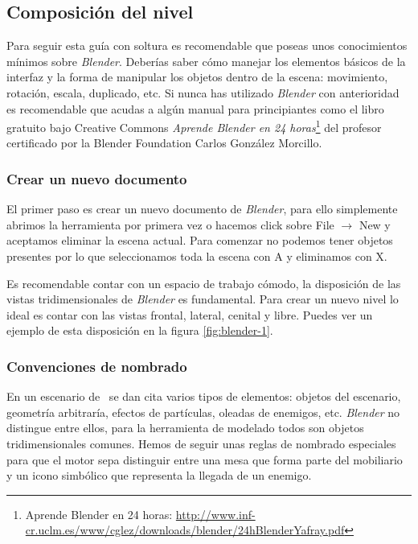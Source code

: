 \documentclass[a4paper,11pt]{article}
\begin{document}
\subsection{Composición del nivel}

Para seguir esta guía con soltura es recomendable que poseas unos conocimientos
mínimos sobre \textit{Blender}. Deberías saber cómo manejar los elementos
básicos de la interfaz y la forma de manipular los objetos dentro de la
escena: movimiento, rotación, escala, duplicado, etc. Si nunca has utilizado
\textit{Blender} con anterioridad es recomendable que acudas a algún
manual para principiantes como el libro gratuito bajo Creative Commons
\textit{Aprende Blender en 24 horas}\footnote{Aprende Blender en 24 horas: 
\url{http://www.inf-cr.uclm.es/www/cglez/downloads/blender/24hBlenderYafray.pdf}}
del profesor certificado por la Blender Foundation Carlos González Morcillo.

\subsubsection{Crear un nuevo documento}

El primer paso es crear un nuevo documento de \textit{Blender}, para ello
simplemente abrimos la herramienta por primera vez o hacemos click sobre
File $\rightarrow$ New y aceptamos eliminar la escena actual. Para comenzar
no podemos tener objetos presentes por lo que seleccionamos toda la escena
con A y eliminamos con X.


Es recomendable contar con un espacio de trabajo cómodo, la disposición
de las vistas tridimensionales de \textit{Blender} es fundamental. Para
crear un nuevo nivel lo ideal es contar con las vistas frontal, lateral,
cenital y libre. Puedes ver un ejemplo de esta disposición en la figura
\ref{fig:blender-1}.

\subsubsection{Convenciones de nombrado}

En un escenario de \juego\ se dan cita varios tipos de elementos: objetos
del escenario, geometría arbitraría, efectos de partículas, oleadas de enemigos,
etc. \textit{Blender} no distingue entre ellos, para la herramienta de modelado
todos son objetos tridimensionales comunes. Hemos de seguir unas reglas de
nombrado especiales para que el motor sepa distinguir entre una mesa que
forma parte del mobiliario y un icono simbólico que representa la llegada
de un enemigo.\\
\end{document}

